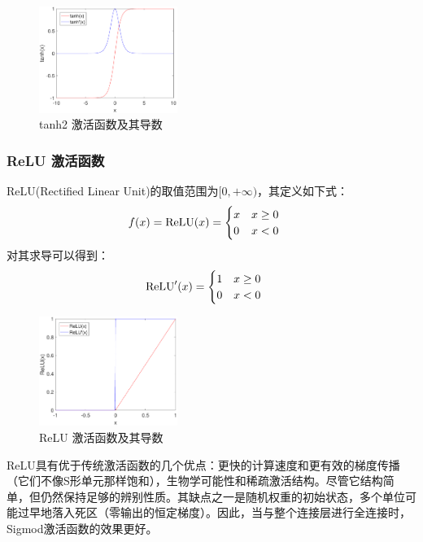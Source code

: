\begin{figure}[!t]
	\centering
	\includegraphics[width=0.4\textwidth]{figures/networks/tanh2}
	\caption{tanh2 激活函数及其导数}
	\label{fig:tanh2}
\end{figure}

\subsubsection{ReLU 激活函数}

ReLU(Rectified Linear Unit)的取值范围为$[0,+\infty)$，其定义如下式：
\begin{align}
f(x)&={\rm ReLU}(x)=\begin{cases}
      x & x\geq 0 \\
      0& x<0
   \end{cases}\;
\end{align}
对其求导可以得到：
\begin{align}
{\rm ReLU}'(x)&=\begin{cases}
      1 & x\geq 0 \\
      0 & x<0
   \end{cases}\;
\end{align}

\begin{figure}[!t]
	\centering
	\includegraphics[width=0.4\textwidth]{figures/networks/ReLU}
	\caption{ReLU 激活函数及其导数}
	\label{fig:ReLU}
\end{figure}

ReLU具有优于传统激活函数的几个优点：更快的计算速度和更有效的梯度传播（它们不像S形单元那样饱和），生物学可能性和稀疏激活结构。尽管它结构简单，但仍然保持足够的辨别性质。其缺点之一是随机权重的初始状态，多个单位可能过早地落入死区（零输出的恒定梯度）。因此，当与整个连接层进行全连接时，Sigmod激活函数的效果更好。

